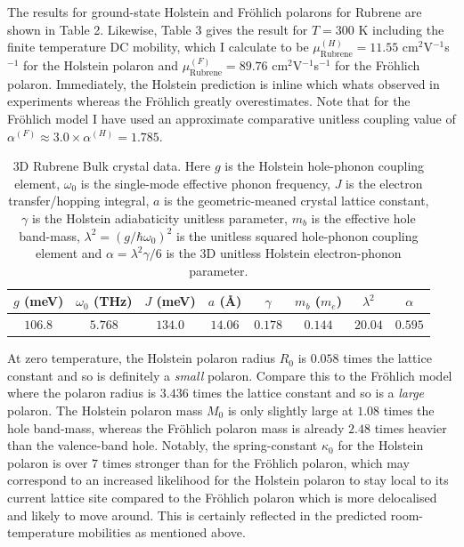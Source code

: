 The results for ground-state Holstein and Fr\"ohlich polarons for Rubrene are shown in Table 2. Likewise, Table 3 gives the result for $T = 300$ K including the finite temperature DC mobility, which I calculate to be $\mu^{(H)}_{\text{Rubrene}} = 11.55$ cm$^2$V$^{-1}$s$^{-1}$ for the Holstein polaron and $\mu^{(F)}_{\text{Rubrene}} = 89.76$ cm$^2$V$^{-1}$s$^{-1}$ for the Fr\"ohlich polaron. Immediately, the Holstein prediction is inline which whats observed in experiments whereas the Fr\"ohlich greatly overestimates. Note that for the Fr\"ohlich model I have used an approximate comparative unitless coupling value of $\alpha^{(F)} \approx 3.0 \times \alpha^{(H)} = 1.785$.
\newline

\begin{table}
    \centering
    \begin{tabular}{|c|c|c|c|c|c|c|c|}
    \hline
        $g$ (meV) & $\omega_0$ (THz) & $J$ (meV) & $a$ (Å) & $\gamma$ & $m_b$ ($m_e$) & $\lambda^2$ & $\alpha$ \\
    \hline
         $106.8$ & $5.768$ & $134.0$ & $14.06$ & $0.178$ & $0.144$ & $20.04$ & $0.595$ \\
    \hline
    \end{tabular}
    \caption{3D Rubrene Bulk crystal data. Here $g$ is the Holstein hole-phonon coupling element, $\omega_0$ is the single-mode effective phonon frequency, $J$ is the electron transfer/hopping integral, $a$ is the geometric-meaned crystal lattice constant, $\gamma$ is the Holstein adiabaticity unitless parameter, $m_b$ is the effective hole band-mass, $\lambda^2 = (g / \hbar\omega_0)^2$ is the unitless squared hole-phonon coupling element and $\alpha = \lambda^2 \gamma / 6$ is the 3D unitless Holstein electron-phonon parameter.}
    \label{tab:rubrene}
\end{table}

At zero temperature, the Holstein polaron radius $R_0$ is $0.058$ times the lattice constant and so is definitely a \emph{small} polaron. Compare this to the Fr\"ohlich model where the polaron radius is $3.436$ times the lattice constant and so is a \emph{large} polaron. The Holstein polaron mass $M_0$ is only slightly large at $1.08$ times the hole band-mass, whereas the Fr\"ohlich polaron mass is already $2.48$ times heavier than the valence-band hole. Notably, the spring-constant $\kappa_0$ for the Holstein polaron is over $7$ times stronger than for the Fr\"ohlich polaron, which may correspond to an increased likelihood for the Holstein polaron to stay local to its current lattice site compared to the Fr\"ohlich polaron which is more delocalised and likely to move around. This is certainly reflected in the predicted room-temperature mobilities as mentioned above.
\newline

